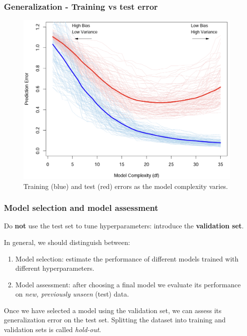 \documentclass{beamer}
\begin{document}
	\begin{frame}
	\frametitle{Generalization - Training vs test error}
	\begin{figure}
		\centering
		\includegraphics[scale=0.8]{images/model_selection_general_idea}
		\caption{Training (blue) and test (red) errors as the model complexity varies.}
	\end{figure}
\end{frame}

	\begin{frame}
		\frametitle{Model selection and model assessment}
		
		Do \textbf{not} use the test set to tune hyperparameters: introduce the \textbf{validation set}.
		
		\vspace{5mm}
		
		In general, we should distinguish between:
		\begin{enumerate}
		\item Model selection: estimate the performance of different models trained with different hyperparameters. 
		\item Model assessment: after choosing a final model we evaluate its performance on \textsl{new, previously unseen} (test) data.
		\end{enumerate}
		
		\vspace{5mm}
		
		Once we have selected a model using the validation set, we can assess its generalization error on the test set. Splitting the dataset into training and validation sets is called \textit{hold-out}.
	\end{frame}
\end{document}
